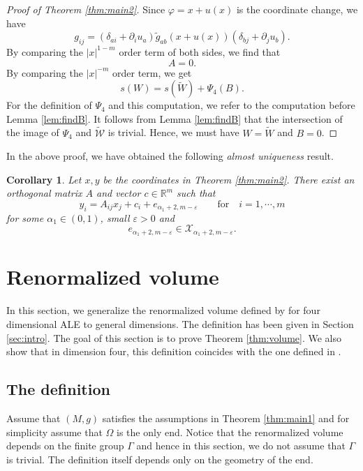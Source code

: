 \documentclass{amsart}
\newtheorem{cor}[thm]{Corollary}
\newcommand{\abs}[1]{\left\vert#1\right\vert}
\newcommand{\Real}{\mathbb R}
\numberwithin{equation}{section}
\begin{document}
\begin{proof}[Proof of Theorem \ref{thm:main2}]
	Since $\varphi=x+u(x)$ is the coordinate change, we have 
	\[
		g_{ij} = (\delta_{ai}+ \partial_i u_a) \tilde{g}_{ab}(x+u(x)) (\delta_{bj}+ \partial_j u_b).
	\]
	By comparing the $\abs{x}^{1-m}$ order term of both sides, we find that
	\[
		A=0.
	\]
	By comparing the $\abs{x}^{-m}$ order term, we get
	\[
		s(W)=s(\tilde{W})+ \Psi_4(B).
	\]
	For the definition of $\Psi_4$ and this computation, we refer to the computation before Lemma \ref{lem:findB}. It follows from Lemma \ref{lem:findB} that the intersection of the image of $\Psi_4$ and $\widetilde{{\mathcal W}}$ is trivial. Hence, we must have $W=\tilde{W}$ and $B=0$.
\end{proof}
In the above proof, we have obtained the following {\it almost uniqueness} result.
\begin{cor}
	\label{cor:apply}
	Let $x,y$ be the coordinates in Theorem \ref{thm:main2}. There exist an orthogonal matrix $A$ and vector $c\in \Real^m$ such that
	\[
		y_i= A_{ij}x_j + c_i + e_{\alpha_1+2,m-\varepsilon} \qquad \text{for} \quad i=1,\cdots ,m
	\]
	for some $\alpha_1\in (0,1)$, small $\varepsilon>0$ and
	\[
		e_{\alpha_1+2,m-\varepsilon}\in \mathcal X_{\alpha_1+2,m-\varepsilon}.
	\]
\end{cor}


\section{Renormalized volume}
\label{sec:application}

In this section, we generalize the renormalized volume defined by \cite{biquard2023renormalized} for four dimensional ALE to general dimensions. The definition has been given in Section \ref{sec:intro}. The goal of this section is to prove Theorem \ref{thm:volume}. We also show that in dimension four, this definition coincides with the one defined in \cite{biquard2023renormalized}.


\subsection{The definition}
\label{sub:welldefine}
Assume that $(M,g)$ satisfies the assumptions in Theorem \ref{thm:main1} and for simplicity assume that $\Omega$ is the only end. Notice that the renormalized volume depends on the finite group $\Gamma$ and hence in this section, we do not assume that $\Gamma$ is trivial. The definition itself depends only on the geometry of the end.
\end{document}
